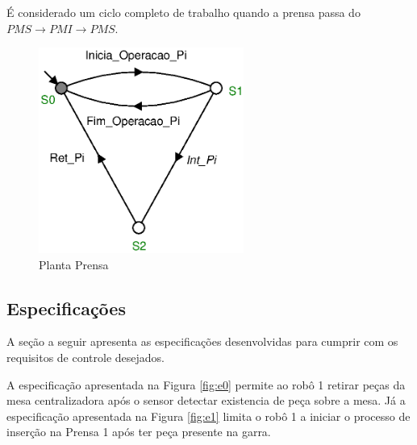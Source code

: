 É considerado um ciclo completo de trabalho quando a prensa passa do $PMS \to PMI \to PMS$. 

\begin{figure}[H]%
    \centering
    \includegraphics[width=0.6\textwidth]{imagens/Prensa.eps}
    \caption{Planta Prensa}\label{fig:prensa}
\end{figure}

\subsection{Especificações}
A seção a seguir apresenta as especificações desenvolvidas para cumprir com os requisitos de controle desejados.

A especificação apresentada na Figura \ref{fig:e0} permite ao robô 1 retirar peças da mesa centralizadora após o sensor detectar existencia de peça sobre a mesa.
Já a especificação apresentada na Figura \ref{fig:e1} limita o robô 1 a iniciar o processo de inserção na Prensa 1 após ter peça presente na garra.


